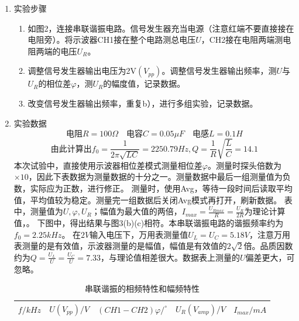 \documentclass[UTF8]{article}
\begin{document}
\begin{enumerate}
    \item 实验步骤
    \begin{enumerate}
        \item 如图2，连接串联谐振电路。信号发生器充当电源（注意红端不要直接接在电阻旁）。将示波器CH1接在整个电路测总电压$U$，CH2接在电阻两端测电阻两端的电压$U_R$。
        \item 调整信号发生器输出电压为2V$(V_{pp})$。调整信号发生器输出频率，测$U$与$U_R$的相位差$\varphi$，测$U_R$的幅度值，记录数据。
        \item 改变信号发生器输出频率，重复b），进行多组实验，记录数据。
    \end{enumerate}
    \item 实验数据
    \[\text{电阻}R=100\Omega \quad \text{电容}C=0.05\mu F \quad \text{电感}L=0.1H \]
    \[\text{由此计算出}f_0=\frac{1}{2\pi\sqrt{LC}}=2250.79Hz,Q=\frac{1}{R}\sqrt{\frac{L}{C}}=14.1\]
    \hspace*{2em} 本次试验中，直接使用示波器相位差模式测量相位差$\varphi$。测量时探头倍数为$\times 10$，因此下表数据为测量数据的十分之一。测量数据中最后一组测量值为负数，实际应为正数，进行修正。
    \newline \hspace*{2em}测量时，使用Avg，等待一段时间后读取平均值，平均值较为稳定。测量完一组数据后关闭Avg模式再打开，刷新数据。
    \newline \hspace*{2em}表中，测量值为$U,\varphi,U_{R}$；幅值为最大值的两倍，$I_{max}=\frac{U_{Rmax}}{R}=\frac{U_R}{2R}$为理论计算值，。
    \newline \hspace*{2em}下图中，得出结果与图3(b)(c)相符。本串联谐振电路的谐振频率约为$f_0=2.25kHz$。
    \newline \hspace*{2em}在$2V$输入电压下，万用表测量值$U_L=U_C=5.18V$，注意万用表测量的是有效值，示波器测量的是幅值，幅值是有效值的$2\sqrt{2}$倍。品质因数约为$Q=\frac{U_L}{U}=\frac{U_C}{U}=7.33$，与理论值相差很大。数据表上测量的$U$偏差更大，可忽略。
        \begin{table}[H]
          \centering
          \caption{串联谐振的相频特性和幅频特性}
            \begin{tabular}{|r|r|r|r|r|}\hline
            $f/kHz$ &$U(V_{pp})/V$  &$\left(CH1-CH2\right)\varphi/^\circ$  &$U_{R} \left(V_{amp}\right) /V$  &$I_{max}/mA$\\\hline


\end{tabular}
\end{table}
\end{enumerate}
\end{document}
